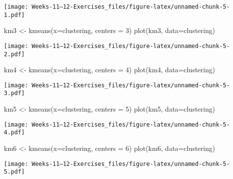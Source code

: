 \documentclass[
]{article}
\newenvironment{Shaded}{\begin{snugshade}}{\end{snugshade}}
\newcommand{\AttributeTok}[1]{\textcolor[rgb]{0.77,0.63,0.00}{#1}}
\newcommand{\DecValTok}[1]{\textcolor[rgb]{0.00,0.00,0.81}{#1}}
\newcommand{\FunctionTok}[1]{\textcolor[rgb]{0.00,0.00,0.00}{#1}}
\newcommand{\NormalTok}[1]{#1}
\newcommand{\OtherTok}[1]{\textcolor[rgb]{0.56,0.35,0.01}{#1}}
\begin{document}
\texttt{[image: Weeks-11---12-Exercises\_files/figure-latex/unnamed-chunk-5-1.pdf]}

\begin{Shaded}
\begin{Highlighting}[]
\NormalTok{km3 }\OtherTok{\textless{}{-}}  \FunctionTok{kmeans}\NormalTok{(}\AttributeTok{x=}\NormalTok{clustering, }\AttributeTok{centers =} \DecValTok{3}\NormalTok{)}
\FunctionTok{plot}\NormalTok{(km3, }\AttributeTok{data=}\NormalTok{clustering)}
\end{Highlighting}
\end{Shaded}

\texttt{[image: Weeks-11---12-Exercises\_files/figure-latex/unnamed-chunk-5-2.pdf]}

\begin{Shaded}
\begin{Highlighting}[]
\NormalTok{km4 }\OtherTok{\textless{}{-}}  \FunctionTok{kmeans}\NormalTok{(}\AttributeTok{x=}\NormalTok{clustering, }\AttributeTok{centers =} \DecValTok{4}\NormalTok{)}
\FunctionTok{plot}\NormalTok{(km4, }\AttributeTok{data=}\NormalTok{clustering)}
\end{Highlighting}
\end{Shaded}

\texttt{[image: Weeks-11---12-Exercises\_files/figure-latex/unnamed-chunk-5-3.pdf]}

\begin{Shaded}
\begin{Highlighting}[]
\NormalTok{km5 }\OtherTok{\textless{}{-}}  \FunctionTok{kmeans}\NormalTok{(}\AttributeTok{x=}\NormalTok{clustering, }\AttributeTok{centers =} \DecValTok{5}\NormalTok{)}
\FunctionTok{plot}\NormalTok{(km5, }\AttributeTok{data=}\NormalTok{clustering)}
\end{Highlighting}
\end{Shaded}

\texttt{[image: Weeks-11---12-Exercises\_files/figure-latex/unnamed-chunk-5-4.pdf]}

\begin{Shaded}
\begin{Highlighting}[]
\NormalTok{km6 }\OtherTok{\textless{}{-}}  \FunctionTok{kmeans}\NormalTok{(}\AttributeTok{x=}\NormalTok{clustering, }\AttributeTok{centers =} \DecValTok{6}\NormalTok{)}
\FunctionTok{plot}\NormalTok{(km6, }\AttributeTok{data=}\NormalTok{clustering)}
\end{Highlighting}
\end{Shaded}

\texttt{[image: Weeks-11---12-Exercises\_files/figure-latex/unnamed-chunk-5-5.pdf]}
\end{document}
